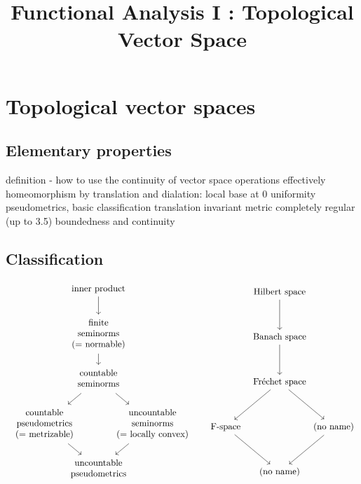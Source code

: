 \documentclass{../crs}
\title{Functional Analysis I : Topological Vector Space}
\begin{document}
\maketitle
\tableofcontents





\chapter{Topological vector spaces}

\section{Elementary properties}
definition - how to use the continuity of vector space operations effectively
homeomorphism by translation and dialation: local base at 0
uniformity pseudometrics, basic classification
translation invariant metric
completely regular (up to 3.5)
boundedness and continuity


\section{Classification}
\[
\begin{tikzcd}[row sep={50pt,between origins}, column sep={60pt,between origins}]
& \text{inner product} \ar{d} & \\
& \begin{tabular}{c}finite\\seminorms\\(= normable)\end{tabular} \ar{d} & \\
& \begin{tabular}{c}countable\\seminorms\end{tabular} \ar{ld}\ar{rd} & \\
  \begin{tabular}{c}countable\\pseudometrics\\(= metrizable)\end{tabular} \ar{rd} &
& \begin{tabular}{c}uncountable\\seminorms\\(= locally convex)\end{tabular} \ar{ld} \\
& \begin{tabular}{c}uncountable\\pseudometrics\end{tabular}
\end{tikzcd}
\quad
\begin{tikzcd}[row sep={50pt,between origins}, column sep={60pt,between origins}]
& \text{Hilbert space} \ar{d} & \\
& \text{Banach space} \ar{d} & \\
& \text{Fr\'echet space} \ar{ld}\ar{rd} & \\
  \text{F-space} \ar{rd} &
& \text{(no name)} \ar{ld} \\
& \text{(no name)}
\end{tikzcd}
\]
\end{document}
